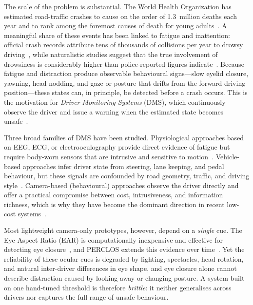 \documentclass[conference]{IEEEtran}
\begin{document}
The scale of the problem is substantial. The World Health Organization has estimated road-traffic crashes to cause on the order of 1.3~million deaths each year and to rank among the foremost causes of death for young adults~\cite{who2018}. A meaningful share of these events has been linked to fatigue and inattention: official crash records attribute tens of thousands of collisions per year to drowsy driving~\cite{nhtsa}, while naturalistic studies suggest that the true involvement of drowsiness is considerably higher than police-reported figures indicate~\cite{tefft}. Because fatigue and distraction produce observable behavioural signs---slow eyelid closure, yawning, head nodding, and gaze or posture that drifts from the forward driving position---these states can, in principle, be detected before a crash occurs. This is the motivation for \emph{Driver Monitoring Systems} (DMS), which continuously observe the driver and issue a warning when the estimated state becomes unsafe~\cite{kaplan,sikander}.

Three broad families of DMS have been studied. Physiological approaches based on EEG, ECG, or electrooculography provide direct evidence of fatigue but require body-worn sensors that are intrusive and sensitive to motion~\cite{ji2004}. Vehicle-based approaches infer driver state from steering, lane keeping, and pedal behaviour, but these signals are confounded by road geometry, traffic, and driving style~\cite{baccour,mcdonald}. Camera-based (behavioural) approaches observe the driver directly and offer a practical compromise between cost, intrusiveness, and information richness, which is why they have become the dominant direction in recent low-cost systems~\cite{bergasa,ramzan}.

Most lightweight camera-only prototypes, however, depend on a \emph{single} cue. The Eye Aspect Ratio (EAR) is computationally inexpensive and effective for detecting eye closure~\cite{soukopova}, and PERCLOS extends this evidence over time~\cite{wierwille,dinges}. Yet the reliability of these ocular cues is degraded by lighting, spectacles, head rotation, and natural inter-driver differences in eye shape, and eye closure alone cannot describe distraction caused by looking away or changing posture. A system built on one hand-tuned threshold is therefore \emph{brittle}: it neither generalises across drivers nor captures the full range of unsafe behaviour.
\end{document}
